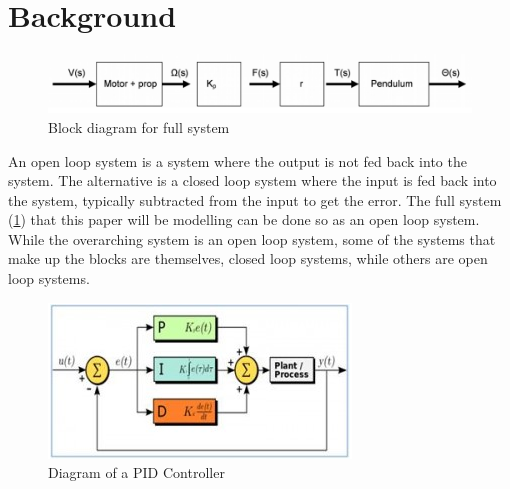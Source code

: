 \documentclass[a4paper, 11pt, compsoc]{IEEEtran}
\begin{document}
    \section{Background}\label{sec:bg}
        \begin{figure}[!h]
            \centering
            \includegraphics[width=\columnwidth]{overallBlockDiagram.png}
            \caption{Block diagram for full system}
            \label{fig:fullBlockDiagram}
        \end{figure}
        An open loop system is a system where the output is not fed back into the system. The alternative is a closed loop system where the input is fed back into the system, typically subtracted from the input to get the error. The full system (\cref{fig:fullBlockDiagram}) that this paper will be modelling can be done so as an open loop system. While the overarching system is an open loop system, some of the systems that make up the blocks are themselves, closed loop systems, while others are open loop systems.
        \par
        \begin{figure}[!h]
            \centering
            \includegraphics[width=\columnwidth]{PID.png}
            \caption{Diagram of a PID Controller \cite{elprocus}}
            \label{fig:pid}
        \end{figure}
\end{document}
